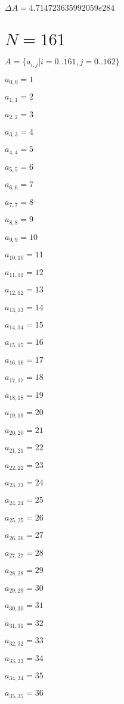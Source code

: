 \documentclass[a4paper,12pt]{article}
\begin{document}
$\Delta A = 4.714723635992059e284$



\section{ $N = 161$ }
$A = \{ a _{ i, j } | i = \overline { 0..161 }, j = \overline { 0..162 } \}$

$a _{ 0, 0 } = 1$

$a _{ 1, 1 } = 2$

$a _{ 2, 2 } = 3$

$a _{ 3, 3 } = 4$

$a _{ 4, 4 } = 5$

$a _{ 5, 5 } = 6$

$a _{ 6, 6 } = 7$

$a _{ 7, 7 } = 8$

$a _{ 8, 8 } = 9$

$a _{ 9, 9 } = 10$

$a _{ 10, 10 } = 11$

$a _{ 11, 11 } = 12$

$a _{ 12, 12 } = 13$

$a _{ 13, 13 } = 14$

$a _{ 14, 14 } = 15$

$a _{ 15, 15 } = 16$

$a _{ 16, 16 } = 17$

$a _{ 17, 17 } = 18$

$a _{ 18, 18 } = 19$

$a _{ 19, 19 } = 20$

$a _{ 20, 20 } = 21$

$a _{ 21, 21 } = 22$

$a _{ 22, 22 } = 23$

$a _{ 23, 23 } = 24$

$a _{ 24, 24 } = 25$

$a _{ 25, 25 } = 26$

$a _{ 26, 26 } = 27$

$a _{ 27, 27 } = 28$

$a _{ 28, 28 } = 29$

$a _{ 29, 29 } = 30$

$a _{ 30, 30 } = 31$

$a _{ 31, 31 } = 32$

$a _{ 32, 32 } = 33$

$a _{ 33, 33 } = 34$

$a _{ 34, 34 } = 35$

$a _{ 35, 35 } = 36$
\end{document}

